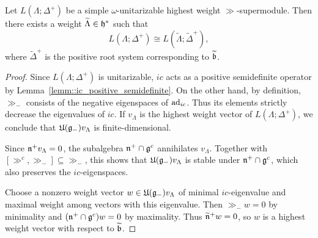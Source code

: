 \begin{lemma}\label{lemm::simple_new_system}
Let $L(\Lambda;\Delta^+)$ be a simple $\omega$-unitarizable highest weight $\gg$-supermodule. Then there exists a weight $\widetilde{\Lambda}\in{\mathfrak h}^*$ such that
\begin{equation*}
L(\Lambda;\Delta^+)\cong L(\widetilde{\Lambda};\widetilde{\Delta}^+),
\end{equation*}
where $\widetilde{\Delta}^+$ is the positive root system corresponding to $\widetilde{{\mathfrak b}}$.
\end{lemma}

\begin{proof}
    Since $L(\Lambda;\Delta^{+})$ is unitarizable, $ic$ acts as a positive semidefinite operator by Lemma~\ref{lemm::ic_positive_semidefinite}. On the other hand, by definition, $\gg_-$ consists of the negative eigenspaces of $\operatorname{ad}_{ic}$. Thus its elements strictly decrease the eigenvalues of $ic$. If $v_\Lambda$ is the highest weight vector of $L(\Lambda;\Delta^+)$, we conclude that ${\mathfrak U}({\mathfrak{g}}_-)v_\Lambda$ is finite-dimensional.

Since ${\mathfrak{n}}^+v_\Lambda=0$, the subalgebra ${\mathfrak{n}}^+\cap{\mathfrak{g}}^c$ annihilates $v_\Lambda$. Together with $[\gg^c,\gg_-]\subseteq\gg_-$, this shows that ${\mathfrak U}({\mathfrak{g}}_-)v_\Lambda$ is stable under ${\mathfrak{n}}^+\cap{\mathfrak{g}}^c$, which also preserves the $ic$-eigenspaces.

Choose a nonzero weight vector $w\in{\mathfrak U}({\mathfrak{g}}_-)v_\Lambda$ of minimal $ic$-eigenvalue and maximal weight among vectors with this eigenvalue. Then $\gg_-w=0$ by minimality and $({\mathfrak{n}}^+\cap{\mathfrak{g}}^c)w=0$ by maximality. Thus $\widetilde{{\mathfrak{n}}}^+w=0$, so $w$ is a highest weight vector with respect to $\widetilde{{\mathfrak b}}$.
\end{proof}


